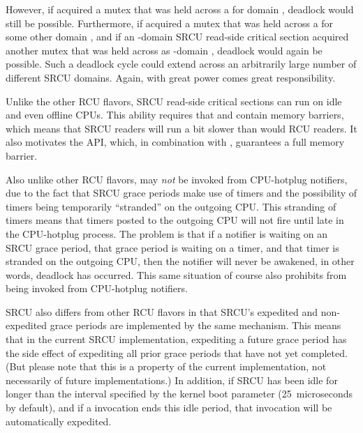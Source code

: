 However, if \clnref{} %
acquired a mutex that was held across a
 for domain , deadlock would still be
possible.
Furthermore, if \clnref{} %
acquired a mutex that was held across a
 for some other domain , and if an
-domain SRCU read-side critical section acquired another mutex
that was held across as -domain , deadlock
would again be possible.
Such a deadlock cycle could extend across an
arbitrarily large number of different SRCU domains.
Again, with great
power comes great responsibility.

Unlike the other RCU flavors, SRCU read-side critical sections can run
on idle and even offline CPUs.
This ability requires that
 and  contain memory barriers,
which means that SRCU readers will run a bit slower than would RCU
readers.
It also motivates the  API,
which, in combination with , guarantees a full
memory barrier.

Also unlike other RCU flavors,  may \emph{not} be
invoked from CPU-hotplug notifiers, due to the fact that SRCU grace
periods make use of timers and the possibility of timers being
temporarily ``stranded'' on the outgoing CPU\@.
This stranding of timers
means that timers posted to the outgoing CPU will not fire until late in
the CPU-hotplug process.
The problem is that if a notifier is waiting on
an SRCU grace period, that grace period is waiting on a timer, and that
timer is stranded on the outgoing CPU, then the notifier will never be
awakened, in other words, deadlock has occurred.
This same situation of
course also prohibits  from being invoked from
CPU-hotplug notifiers.

SRCU also differs from other RCU flavors in that SRCU's expedited and
non-expedited grace periods are implemented by the same mechanism.
This
means that in the current SRCU implementation, expediting a future grace
period has the side effect of expediting all prior grace periods that
have not yet completed.
(But please note that this is a property of the
current implementation, not necessarily of future implementations.)
In
addition, if SRCU has been idle for longer than the interval specified
by the  kernel boot parameter (25 microseconds
by default), and if a  invocation ends this idle
period, that invocation will be automatically expedited.

